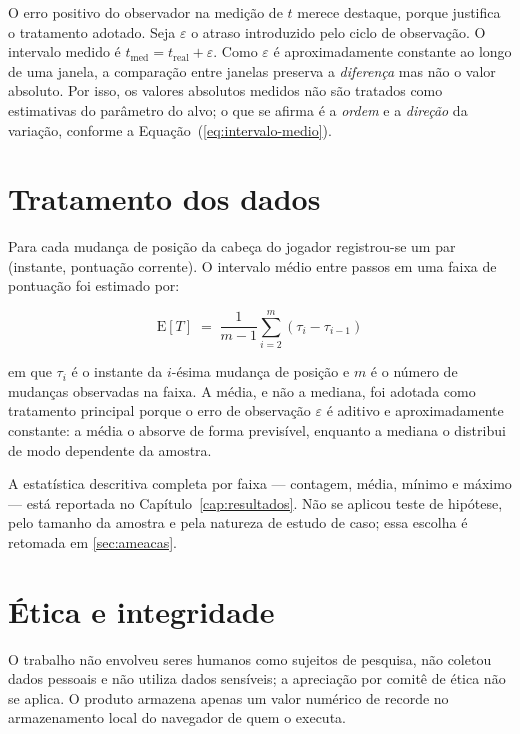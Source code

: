 O erro positivo do observador na medição de $t$ merece destaque, porque justifica
o tratamento adotado. Seja $\varepsilon$ o atraso introduzido pelo ciclo de
observação. O intervalo medido é $t_{\mathrm{med}} = t_{\mathrm{real}} +
\varepsilon$. Como $\varepsilon$ é aproximadamente constante ao longo de uma
janela, a comparação entre janelas preserva a \emph{diferença} mas não o valor
absoluto. Por isso, os valores absolutos medidos não são tratados como
estimativas do parâmetro do alvo; o que se afirma é a \emph{ordem} e a
\emph{direção} da variação, conforme a Equação~(\ref{eq:intervalo-medio}).

\section{Tratamento dos dados}
\label{sec:tratamento}

Para cada mudança de posição da cabeça do jogador registrou-se um par
(instante, pontuação corrente). O intervalo médio entre passos em uma faixa de
pontuação foi estimado por:

\begin{equation}
	\mathrm{E}[T] \;=\; \frac{1}{m-1}
	\sum_{i=2}^{m} \left( \tau_i - \tau_{i-1} \right)
	\label{eq:intervalo-medio}
\end{equation}

\noindent em que $\tau_i$ é o instante da $i$-ésima mudança de posição e $m$ é o
número de mudanças observadas na faixa. A média, e não a mediana, foi adotada
como tratamento principal porque o erro de observação $\varepsilon$ é aditivo e
aproximadamente constante: a média o absorve de forma previsível, enquanto a
mediana o distribui de modo dependente da amostra.

A estatística descritiva completa por faixa --- contagem, média, mínimo e máximo
--- está reportada no Capítulo~\ref{cap:resultados}. Não se aplicou teste de
hipótese, pelo tamanho da amostra e pela natureza de estudo de caso; essa escolha
é retomada em \ref{sec:ameacas}.

\section{Ética e integridade}
\label{sec:etica}

O trabalho não envolveu seres humanos como sujeitos de pesquisa, não coletou
dados pessoais e não utiliza dados sensíveis; a apreciação por comitê de ética
não se aplica. O produto armazena apenas um valor numérico de recorde no
armazenamento local do navegador de quem o executa.

